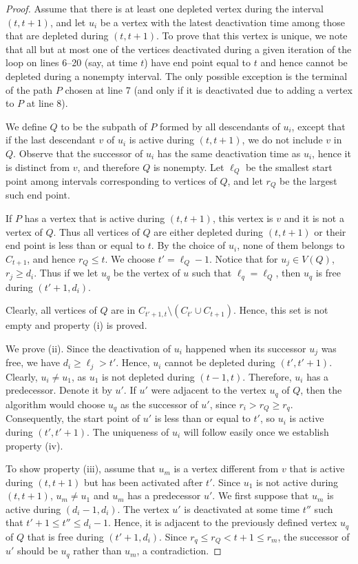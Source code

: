 \documentclass{llncs}
\begin{document}
\begin{proof}
Assume that there is at least one depleted vertex during the interval $(t,t+1)$, and
let $u_i$ be a vertex with the latest deactivation time among those that are depleted during $(t,t+1)$.
To prove that this vertex is unique, we note that all but at most one of the vertices deactivated during a given iteration of the loop on lines 
6--20 (say, at time $t$) have end point equal to $t$ and hence cannot be depleted during a nonempty interval. The only possible exception is the terminal of the path $P$ chosen at line 7 (and only if it is deactivated due to adding a vertex to $P$ at line 8).

We define $Q$ to be the subpath of $P$ formed by all descendants of $u_i$, except that
if the last descendant $v$ of $u_i$ is active during $(t,t+1)$, we do not include $v$ in $Q$.
Observe that the successor of $u_i$ has the same deactivation time as $u_i$, 
hence it is distinct from $v$, and therefore  $Q$ is nonempty.
Let $\ell_Q$ be the smallest start point among intervals corresponding to vertices of $Q$, and let $r_Q$ be the largest such end point. 

If $P$ has a vertex that is active during $(t,t+1)$, this vertex is $v$ and it is not a vertex of $Q$.
Thus all vertices of $Q$ are either depleted during $(t,t+1)$ or their end point is less than or equal to $t$. 
By the choice of $u_i$, none of them belongs to $C_{t+1}$, and hence $r_Q\le t$.
We choose $t'=\ell_Q-1$. Notice that for $u_j\in V(Q)$, $r_j \geq d_i$. Thus if we let $u_q$ be the vertex of $u$ such that $\ell_q = \ell_Q$, then $u_q$ is free during $(t'+1,d_i)$.

Clearly, all vertices of $Q$ are in $C_{t'+1,t}\setminus (C_{t'} \cup C_{t+1})$. Hence, this set is not empty and property (i) is proved.

We prove (ii). Since the deactivation of $u_i$ happened when its successor $u_j$ was free, we have
$d_i\ge \ell_j > t'$. Hence, $u_i$ cannot be depleted during $(t',t'+1)$.
Clearly, $u_i\neq u_1$, as $u_1$ is not depleted during $(t-1,t)$. Therefore,
$u_i$ has a predecessor. Denote it by $u'$.
If $u'$ were adjacent to the vertex $u_q$ of $Q$, then the algorithm would choose $u_q$ as the successor of $u'$, since $r_i > r_Q \geq r_q$. Consequently, the start point of $u'$ is less than or equal to $t'$, so $u_i$ is active during $(t',t'+1)$. The uniqueness of $u_i$ will follow easily once we establish property (iv).

To show property (iii), assume that $u_m$ is a vertex different from $v$ that is active during $(t,t+1)$
but has been activated after $t'$. 
Since $u_1$ is not active during $(t,t+1)$, $u_m\neq u_1$ and $u_m$ has a predecessor $u'$.
We first suppose that $u_m$ is active during $(d_i-1,d_i)$. 
The vertex $u'$ is deactivated at some time $t''$ such that $t'+1\leq t''\leq d_i-1$. Hence, it is adjacent to the previously defined vertex $u_q$ of $Q$ that is free during $(t'+1,d_i)$. Since $r_q \leq r_Q < t+1 \leq r_m$, the successor of $u'$ should be $u_q$ rather than $u_m$, a contradiction.   


\end{proof}
\end{document}
